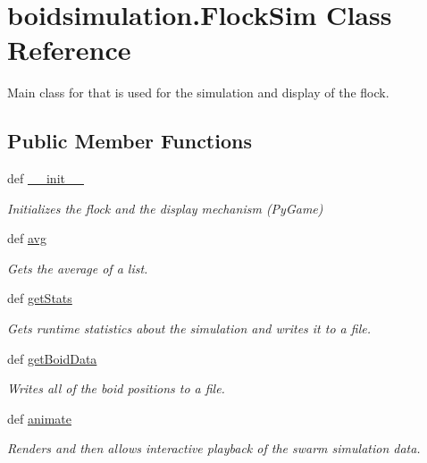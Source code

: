 \hypertarget{classboidsimulation_1_1FlockSim}{\section{boidsimulation.\-Flock\-Sim Class Reference}
\label{classboidsimulation_1_1FlockSim}
}


Main class for that is used for the simulation and display of the flock.  


\subsection*{Public Member Functions}
\begin{DoxyCompactItemize}
\item 
def \hyperlink{classboidsimulation_1_1FlockSim_a7221a17466a06ad9018024d80b6bbff8}{\-\_\-\-\_\-init\-\_\-\-\_\-}
\begin{DoxyCompactList}\small\item\em Initializes the flock and the display mechanism (Py\-Game) \end{DoxyCompactList}\item 
def \hyperlink{classboidsimulation_1_1FlockSim_ad69cb572160cb83e3c868fc9de4a9e75}{avg}
\begin{DoxyCompactList}\small\item\em Gets the average of a list. \end{DoxyCompactList}\item 
def \hyperlink{classboidsimulation_1_1FlockSim_ae638beb355d9d953fe51e087ff1e6e94}{get\-Stats}
\begin{DoxyCompactList}\small\item\em Gets runtime statistics about the simulation and writes it to a file. \end{DoxyCompactList}\item 
def \hyperlink{classboidsimulation_1_1FlockSim_a57c1ef2f27ac7157afdabae4eefcc370}{get\-Boid\-Data}
\begin{DoxyCompactList}\small\item\em Writes all of the boid positions to a file. \end{DoxyCompactList}\item 
def \hyperlink{classboidsimulation_1_1FlockSim_a4fb29f4acff12a3d9b9a88280501320d}{animate}
\begin{DoxyCompactList}\small\item\em Renders and then allows interactive playback of the swarm simulation data. \end{DoxyCompactList}\item 

\end{DoxyCompactItemize}
